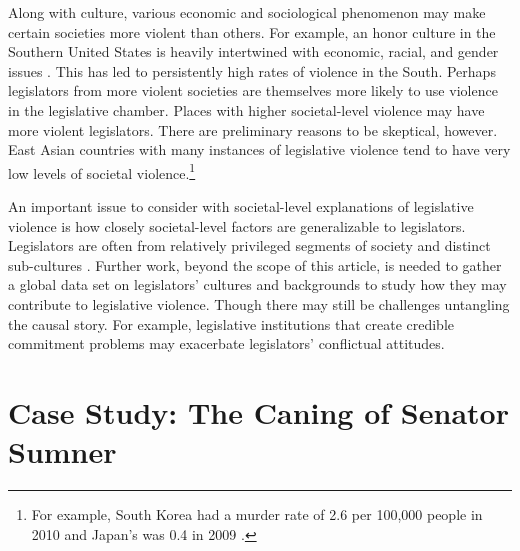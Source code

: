 \documentclass[a4paper]{article}\usepackage[]{graphicx}\usepackage[]{color}
\begin{document}
Along with culture, various economic and sociological phenomenon may make certain societies more violent than others. For example, an honor culture in the Southern United States is heavily intertwined with economic, racial, and gender issues \citep[]{nisbett1996culture}. This has led to persistently high rates of violence in the South. Perhaps legislators from more violent societies are themselves more likely to use violence in the legislative chamber. Places with higher societal-level violence may have more violent legislators. There are preliminary reasons to be skeptical, however. East Asian countries with many instances of legislative violence tend to have very low levels of societal violence.\footnote{For example, South Korea had a murder rate of 2.6 per 100,000 people in 2010 and Japan's was 0.4 in 2009 \cite{UNMurder2013}.}

An important issue to consider with societal-level explanations of legislative violence is how closely societal-level factors are generalizable to legislators. Legislators are often from relatively privileged segments of society and distinct sub-cultures \citep[408]{Spary2013}. Further work, beyond the scope of this article, is needed to gather a global data set on legislators' cultures and backgrounds to study how they may contribute to legislative violence. Though there may still be challenges untangling the causal story. For example, legislative institutions that create credible commitment problems may exacerbate legislators' conflictual attitudes.

\section{Case Study: The Caning of Senator Sumner}

\end{document}
